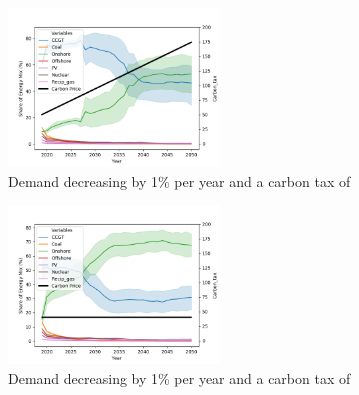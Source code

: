 \begin{figure}[h]
	\begin{center}
		\includegraphics[width=0.5\textwidth]{figures/scenarios/demand099-carbon18-datetime.png}
		\caption{Demand decreasing by 1\% per year and a carbon tax of }
		\label{fig:demand99carbon10}
	\end{center}
\end{figure}



\begin{figure}[h]
	\begin{center}
		\includegraphics[width=0.5\textwidth]{figures/scenarios/demand099-carbon40-datetime.png}
		\caption{Demand decreasing by 1\% per year and a carbon tax of }
		\label{fig:demand99carbon10}
	\end{center}
\end{figure}










